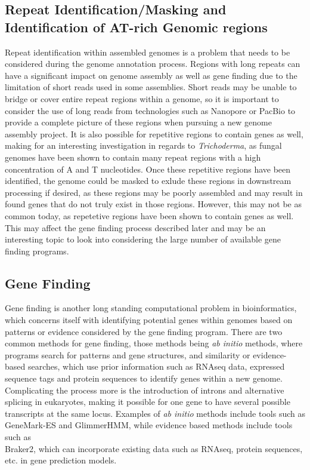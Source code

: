 \documentclass[12pt]{article}
\begin{document}
\subsection{Repeat Identification/Masking and Identification of AT-rich Genomic regions}
Repeat identification within assembled genomes is a problem that needs
to be considered during the genome annotation process. Regions with
long repeats can have a significant impact on genome assembly as well
as gene finding due to the limitation of short reads used in some
assemblies\cite{Repeats}. Short reads may be unable to bridge or cover
entire repeat regions within a genome, so it is important to consider
the use of long reads from technologies such as Nanopore or PacBio to
provide a complete picture of these regions when pursuing a new genome
assembly project. It is also possible for repetitive regions to
contain genes as well, making for an interesting investigation in
regards to \textit{Trichoderma}, as fungal genomes have been shown to
contain many repeat regions with a high concentration of A and T
nucleotides\cite{fungalrepeats}. Once these repetitive regions have
been identified, the genome could be masked to exlude these regions in
downstream processing if desired, as these regions may be poorly
assembled and may result in found genes that do not truly exist in
those regions. However, this may not be as common today, as repetetive
regions have been shown to contain genes as well\cite{dontMask}. This
may affect the gene finding process described later and may be an
interesting topic to look into considering the large number of
available gene finding programs.

\subsection{Gene Finding}
Gene finding is another long standing computational problem in
bioinformatics, which concerns itself with identifying potential genes
within genomes based on patterns or evidence considered by the gene
finding program. There are two common methods for gene finding, those
methods being \textit{ab initio} methods, where programs search for
patterns and gene structures, and similarity or evidence-based
searches, which use prior information such as RNAseq data, expressed
sequence tags and protein sequences to identify genes within a new
genome\cite{GeneFinding}. Complicating the process more is the
introduction of introns and alternative splicing in eukaryotes, making
it possible for one gene to have several possible transcripts at the
same locus. Examples of \textit{ab initio} methods include tools such
as GeneMark-ES\cite{GeneMarkES} and GlimmerHMM\cite{Glimmer}, while
evidence based methods include tools such as \\ Braker2\cite{Braker2},
which can incorporate existing data such as RNAseq, protein sequences,
etc. in gene prediction models.
\end{document}

